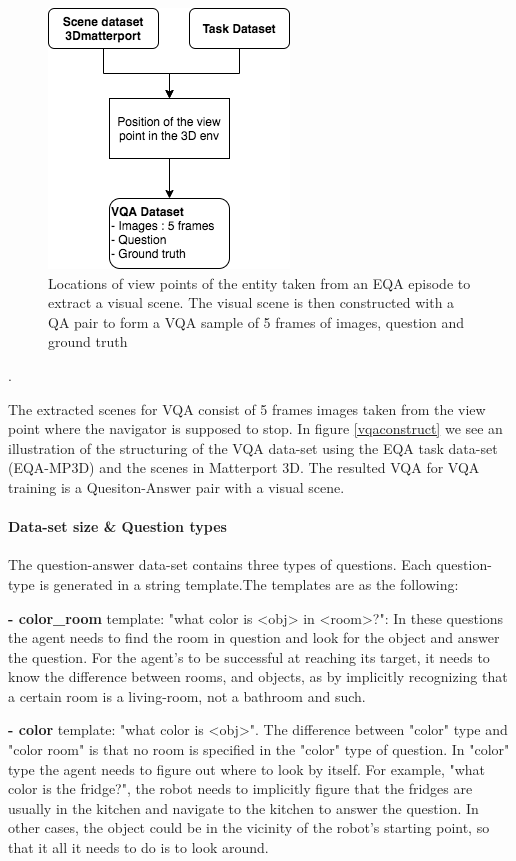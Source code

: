 \begin{figure}[H]
\centering
\includegraphics[scale=0.5]{images/VQAConstruct.png}
\caption{Locations of view points of the entity taken from an EQA episode to extract a visual scene. The visual scene is then constructed with a QA pair to form a VQA sample of 5 frames of images, question and ground truth }
\label{fig:vqaconstruct}
\end{figure}.

The extracted scenes for VQA consist of 5 frames images taken from the view point where the navigator is supposed to stop. In figure \ref{vqaconstruct} we see an illustration of the structuring of the VQA data-set using the EQA task data-set (EQA-MP3D) and the scenes in Matterport 3D. The resulted VQA for VQA training is a Quesiton-Answer pair with a visual scene. 

\paragraph{Data-set size \& Question types}

The question-answer data-set contains three types of questions. Each question-type is generated in a string template.The templates are as the following:

\textbf{- color\_room} template: "what color is <obj> in  <room>?": In these questions the agent needs to find the room in question and look for the object and answer the question. For the agent's to be successful at reaching its target, it needs to know the difference between rooms, and objects, as by implicitly recognizing that a certain room is a living-room, not a bathroom and such.  

\textbf{- color} template: "what color is <obj>". The difference between "color" type and "color room" is that no room is specified in the "color" type of question. In "color" type the agent needs to figure out where to look by itself. For example, "what color is the fridge?", the robot needs to implicitly figure that the fridges are usually in the kitchen and navigate to the kitchen to answer the question. In other cases, the object could be in the vicinity of the robot's starting point, so that it all it needs to do is to look around. 

